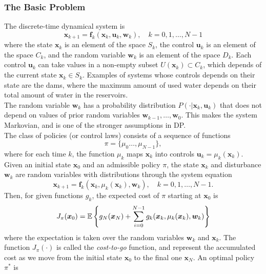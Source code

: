 \subsubsection{The Basic Problem}

The discrete-time dynamical system is
\begin{equation*}
\bm{x}_{k+1}=\bm{f}_k(\bm{x}_k,\bm{u}_k,\bm{w}_k),\quad k=0,1,\dots,N-1
\end{equation*}
where the state $\bm{x}_k$ is an element of the space $S_k$, the control
$\bm{u}_k$ is an element of the space $C_k$, and the random variable
$\bm{w}_k$ is an element of the space $D_k$. Each control $\bm{u}_k$ can take
values in a non-empty subset $U(\bm{x}_k)\subset C_k$, which depends of the
current state $\bm{x}_k\in S_k$. Examples of systems whose controls depends
on their state are the dams, where the maximum amount of used water depends
on their total amount of water in the reservoirs.\\
The random variable $\bm{w}_k $ has a probability distribution 
$P(\cdot|\bm{x}_k,\bm{u}_k)$ that does not depend on values of prior 
random variables $\bm{w}_{k-1},\dots,\bm{w}_0$. This makes the system Markovian, 
and is one of the stronger assumptions in DP.\\
The class of policies (or control laws) consists of a sequence of functions
\begin{equation*}
\pi=\{\mu_0\dots,\mu_{N-1}\},
\end{equation*}
where for each time $k$, the function $\mu_k$ maps $\bm{x}_k$ 
into controls $\bm{u}_k=\mu_k(\bm{x}_k)$.\\
Given an initial state $\bm{x}_0$ and an admissible policy $\pi$, the state 
$\bm{x}_k$ and disturbance $\bm{w}_k$ are random variables with distributions 
through the system equation
\begin{equation*}
\bm{x}_{k+1} = \bm{f}_k(\bm{x}_k,\mu_k(\bm{x}_k),\bm{w}_k),\quad k=0,1,\dots,N-1.
\end{equation*}
Then, for given functions $g_k$, the expected cost of $\pi$ starting at $\bm{x}_0$ is
\begin{equation*}
J_\pi(\bm{x}_0)=\mathbb{E}\left\{g_N(\bm{x}_N)+\sum_{i=0}^{N-1}g_k(\bm{x}_k,\mu_k(\bm{x}_k),\bm{w}_k)\right\}
\end{equation*}
where the expectation is taken over the random variables $\bm{w}_k$ and
$\bm{x}_k$. The function $J_{\pi}(\cdot)$ is called the \textit{cost-to-go}
function, and represent the accumulated cost as we move from the initial
state $\bm{x}_0$ to the final one $\bm{x}_N$. An optimal policy $\pi^*$ is
